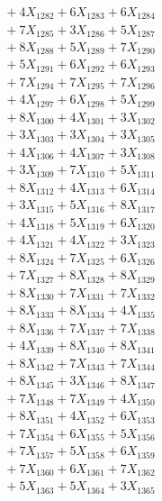 \documentclass[a4paper,10pt]{article}
\begin{document}
{\begin{align}
&\;  + 4 X_{1282} + 6 X_{1283} + 6 X_{1284} \\[0.3ex]
&\;  + 7 X_{1285} + 3 X_{1286} + 5 X_{1287} \\[0.3ex]
&\;  + 8 X_{1288} + 5 X_{1289} + 7 X_{1290} \\[0.3ex]
&\;  + 5 X_{1291} + 6 X_{1292} + 6 X_{1293} \\[0.3ex]
&\;  + 7 X_{1294} + 7 X_{1295} + 7 X_{1296} \\[0.3ex]
&\;  + 4 X_{1297} + 6 X_{1298} + 5 X_{1299} \\[0.5ex]\allowbreak
&\;  + 8 X_{1300} + 4 X_{1301} + 3 X_{1302} \\[0.3ex]
&\;  + 3 X_{1303} + 3 X_{1304} + 3 X_{1305} \\[0.3ex]
&\;  + 4 X_{1306} + 4 X_{1307} + 3 X_{1308} \\[0.3ex]
&\;  + 3 X_{1309} + 7 X_{1310} + 5 X_{1311} \\[0.3ex]
&\;  + 8 X_{1312} + 4 X_{1313} + 6 X_{1314} \\[0.3ex]
&\;  + 3 X_{1315} + 5 X_{1316} + 8 X_{1317} \\[0.3ex]
&\;  + 4 X_{1318} + 5 X_{1319} + 6 X_{1320} \\[0.3ex]
&\;  + 4 X_{1321} + 4 X_{1322} + 3 X_{1323} \\[0.3ex]
&\;  + 8 X_{1324} + 7 X_{1325} + 6 X_{1326} \\[0.3ex]
&\;  + 7 X_{1327} + 8 X_{1328} + 8 X_{1329} \\[0.5ex]\allowbreak
&\;  + 8 X_{1330} + 7 X_{1331} + 7 X_{1332} \\[0.3ex]
&\;  + 8 X_{1333} + 8 X_{1334} + 4 X_{1335} \\[0.3ex]
&\;  + 8 X_{1336} + 7 X_{1337} + 7 X_{1338} \\[0.3ex]
&\;  + 4 X_{1339} + 8 X_{1340} + 8 X_{1341} \\[0.3ex]
&\;  + 8 X_{1342} + 7 X_{1343} + 7 X_{1344} \\[0.3ex]
&\;  + 8 X_{1345} + 3 X_{1346} + 8 X_{1347} \\[0.3ex]
&\;  + 7 X_{1348} + 7 X_{1349} + 4 X_{1350} \\[0.3ex]
&\;  + 8 X_{1351} + 4 X_{1352} + 6 X_{1353} \\[0.3ex]
&\;  + 7 X_{1354} + 6 X_{1355} + 5 X_{1356} \\[0.3ex]
&\;  + 7 X_{1357} + 5 X_{1358} + 6 X_{1359} \\[0.5ex]\allowbreak
&\;  + 7 X_{1360} + 6 X_{1361} + 7 X_{1362} \\[0.3ex]
&\;  + 5 X_{1363} + 5 X_{1364} + 3 X_{1365} \\[0.3ex]

\end{align}}
\end{document}
